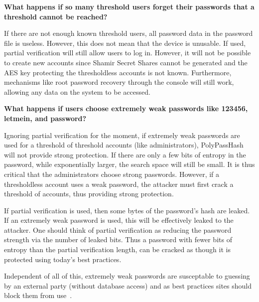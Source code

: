 {\bf What happens if so many threshold users forget their passwords that a
threshold cannot be reached?}

If there are not enough known threshold users, all password data in the
password file is useless.   However, this does not mean that the device is
unusable.   If used, partial verification will still allow users to log in.   
However, it will not be possible to create new accounts since Shamir
Secret Shares cannot be generated and the AES key protecting the thresholdless
accounts is not known.  Furthermore, mechanisms like root password recovery 
through
the console will still work, allowing any data on the system to be accessed.




%



{\bf What happens if users choose extremely weak passwords like 123456, 
letmein, and password?}

Ignoring partial verification for the moment, 
if extremely weak passwords are used for a threshold of threshold accounts 
(like administrators), PolyPassHash will not provide strong protection.   If
there are only a few bits of entropy in the password, while exponentially
larger, the search space will still be small.   It is thus critical that
the administrators choose strong passwords.   However,
if a thresholdless account uses a weak password, the attacker must first
crack a threshold of accounts, thus providing strong protection.

If partial verification is used, then some bytes of the password's 
hash are leaked.   If an extremely weak password is used, this
will be effectively leaked to the attacker.   One should think of partial
verification as reducing the password strength via the number of leaked
bits.   Thus a password with fewer bits of entropy than the partial 
verification length, can be cracked as though it is protected using today's
best practices.


Independent of all of this, extremely weak passwords are susceptable to 
guessing by an external party (without database access) and as best practices
sites should block them from use~\cite{bancommonpasswords}.




